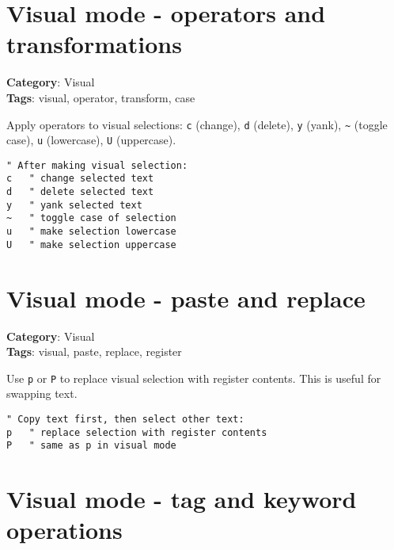 {{{{{{{{{{{{{{{{{{\section{Visual mode - operators and transformations}

\textbf{Category}: Visual\\ \textbf{Tags}: visual, operator, transform, case
\vspace{0.5cm}

Apply operators to visual selections: {\footnotesize \Verb§c§} (change), {\footnotesize \Verb§d§} (delete), {\footnotesize \Verb§y§} (yank), {\footnotesize \Verb§~§} (toggle case), {\footnotesize \Verb§u§} (lowercase), {\footnotesize \Verb§U§} (uppercase).

\begin{Exa*}{}
\begin{Verbatim}[fontsize=\footnotesize, breaklines, breakanywhere]
" After making visual selection:
c   " change selected text
d   " delete selected text
y   " yank selected text
~   " toggle case of selection
u   " make selection lowercase
U   " make selection uppercase
\end{Verbatim}
\end{Exa*}

\section{Visual mode - paste and replace}

\textbf{Category}: Visual\\ \textbf{Tags}: visual, paste, replace, register
\vspace{0.5cm}

Use {\footnotesize \Verb§p§} or {\footnotesize \Verb§P§} to replace visual selection with register contents. This is useful for swapping text.

\begin{Exa*}{}
\begin{Verbatim}[fontsize=\footnotesize, breaklines, breakanywhere]
" Copy text first, then select other text:
p   " replace selection with register contents
P   " same as p in visual mode
\end{Verbatim}
\end{Exa*}

\section{Visual mode - tag and keyword operations}

}}}}}}}}}}}}}}}}}}
